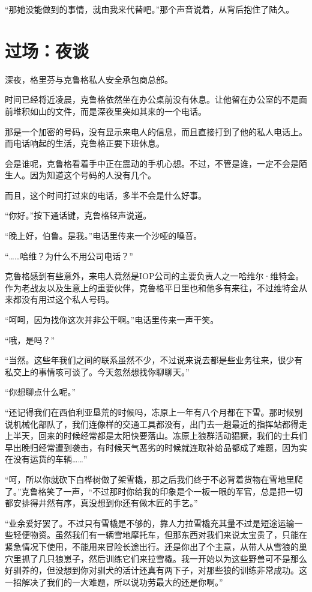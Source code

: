 “那她没能做到的事情，就由我来代替吧。”那个声音说着，从背后抱住了陆久。



\section*{过场：夜谈}

深夜，格里芬与克鲁格私人安全承包商总部。

时间已经将近凌晨，克鲁格依然坐在办公桌前没有休息。让他留在办公室的不是面前堆积如山的文件，而是深夜里突如其来的一个电话。

那是一个加密的号码，没有显示来电人的信息，而且直接打到了他的私人电话上。而电话响起的生活，克鲁格正要下班休息。

会是谁呢，克鲁格看着手中正在震动的手机心想。不过，不管是谁，一定不会是陌生人。因为知道这个号码的人没有几个。

而且，这个时间打过来的电话，多半不会是什么好事。

“你好。”按下通话键，克鲁格轻声说道。

“晚上好，伯鲁。是我。”电话里传来一个沙哑的嗓音。

“……哈维？为什么不用公司电话？”

克鲁格感到有些意外，来电人竟然是IOP公司的主要负责人之一哈维尔·维特金。作为老战友以及生意上的重要伙伴，克鲁格平日里也和他多有来往，不过维特金从来都没有用过这个私人号码。

“呵呵，因为找你这次并非公干啊。”电话里传来一声干笑。

“哦，是吗？”

“当然。这些年我们之间的联系虽然不少，不过说来说去都是些业务往来，很少有私交上的事情咳可谈了。今天忽然想找你聊聊天。”

“你想聊点什么呢。”

“还记得我们在西伯利亚垦荒的时候吗，冻原上一年有八个月都在下雪。那时候别说机械化部队了，我们连像样的交通工具都没有，出门去一趟最近的指挥站都得走上半天，回来的时候经常都是太阳快要落山。冻原上狼群活动猖獗，我们的士兵们早出晚归经常遭到袭击，有时候天气恶劣的时候就连取补给品都成了难题，因为实在没有运货的车辆……”

“呵，所以你就砍下白桦树做了架雪橇，那之后我们终于不必背着货物在雪地里爬了。”克鲁格笑了一声，“不过那时你给我的印象是个一板一眼的军官，总是把一切都安排得井然有序，真没想到你还有做木匠的手艺。”

“业余爱好罢了。不过只有雪橇是不够的，靠人力拉雪橇充其量不过是短途运输一些轻便物资。虽然我们有一辆雪地摩托车，但那东西对我们来说太宝贵了，只能在紧急情况下使用，不能用来冒险长途出行。还是你出了个主意，从带人从雪狼的巢穴里抓了几只狼崽子，然后训练它们来拉雪橇。我一开始以为这些野兽可不是那么好驯养的，但没想到你对驯犬的活计还真有两下子，对那些狼的训练非常成功。这一招解决了我们的一大难题，所以说功劳最大的还是你啊。”

